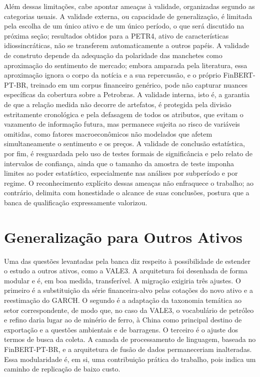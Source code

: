 Além dessas limitações, cabe apontar ameaças à validade, organizadas segundo as categorias usuais. A validade externa, ou capacidade de generalização, é limitada pela escolha de um único ativo e de um único período, o que será discutido na próxima seção; resultados obtidos para a PETR4, ativo de características idiossincráticas, não se transferem automaticamente a outros papéis. A validade de construto depende da adequação da polaridade das manchetes como aproximação do sentimento de mercado; embora amparada pela literatura, essa aproximação ignora o corpo da notícia e a sua repercussão, e o próprio FinBERT-PT-BR, treinado em um corpus financeiro genérico, pode não capturar nuances específicas da cobertura sobre a Petrobras. A validade interna, isto é, a garantia de que a relação medida não decorre de artefatos, é protegida pela divisão estritamente cronológica e pela defasagem de todos os atributos, que evitam o vazamento de informação futura, mas permanece sujeita ao risco de variáveis omitidas, como fatores macroeconômicos não modelados que afetem simultaneamente o sentimento e os preços. A validade de conclusão estatística, por fim, é resguardada pelo uso de testes formais de significância e pelo relato de intervalos de confiança, ainda que o tamanho da amostra de teste imponha limites ao poder estatístico, especialmente nas análises por subperíodo e por regime. O reconhecimento explícito dessas ameaças não enfraquece o trabalho; ao contrário, delimita com honestidade o alcance de suas conclusões, postura que a banca de qualificação expressamente valorizou.

\section{Generalização para Outros Ativos}

Uma das questões levantadas pela banca diz respeito à possibilidade de estender o estudo a outros ativos, como a VALE3. A arquitetura foi desenhada de forma modular e é, em boa medida, transferível. A migração exigiria três ajustes. O primeiro é a substituição da série financeira-alvo pelas cotações do novo ativo e a reestimação do GARCH. O segundo é a adaptação da taxonomia temática ao setor correspondente, de modo que, no caso da VALE3, o vocabulário de petróleo e refino daria lugar ao de minério de ferro, à China como principal destino de exportação e a questões ambientais e de barragens. O terceiro é o ajuste dos termos de busca da coleta. A camada de processamento de linguagem, baseada no FinBERT-PT-BR, e a arquitetura de fusão de dados permaneceriam inalteradas. Essa modularidade é, em si, uma contribuição prática do trabalho, pois indica um caminho de replicação de baixo custo.

